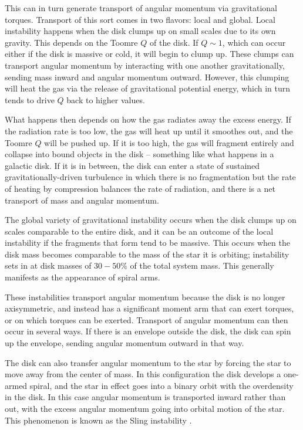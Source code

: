 This can in turn generate transport of angular momentum via gravitational torques. Transport of this sort comes in two flavors: local and global. Local instability happens when the disk clumps up on small scales due to its own gravity. This depends on the Toomre $Q$ of the disk. If $Q\sim 1$, which can occur either if the disk is massive or cold, it will begin to clump up. These clumps can transport angular momentum by interacting with one another gravitationally, sending mass inward and angular momentum outward. However, this clumping will heat the gas via the release of gravitational potential energy, which in turn tends to drive $Q$ back to higher values.

What happens then depends on how the gas radiates away the excess energy. If the radiation rate is too low, the gas will heat up until it smoothes out, and the Toomre $Q$ will be pushed up. If it is too high, the gas will fragment entirely and collapse into bound objects in the disk -- something like what happens in a galactic disk. If it is in between, the disk can enter a state of sustained gravitationally-driven turbulence in which there is no fragmentation but the rate of heating by compression balances the rate of radiation, and there is a net transport of mass and angular momentum.

The global variety of gravitational instability occurs when the disk clumps up on scales comparable to the entire disk, and it can be an outcome of the local instability if the fragments that form tend to be massive. This occurs when the disk mass becomes comparable to the mass of the star it is orbiting; instability sets in at disk masses of $30-50\%$ of the total system mass. This generally manifests as the appearance of spiral arms.

These instabilities transport angular momentum because the disk is no longer axisymmetric, and instead has a significant moment arm that can exert torques, or on which torques can be exerted. Transport of angular momentum can then occur in several ways. If there is an envelope outside the disk, the disk can spin up the envelope, sending angular momentum outward in that way.

The disk can also transfer angular momentum to the star by forcing the star to move away from the center of mass. In this configuration the disk develops a one-armed spiral, and the star in effect goes into a binary orbit with the overdensity in the disk. In this case angular momentum is transported inward rather than out, with the excess angular momentum going into orbital motion of the star. This phenomenon is known as the Sling instability \citet{shu90a}.

